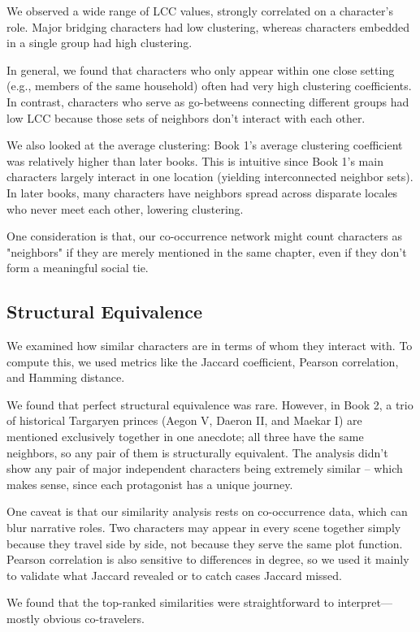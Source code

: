 \documentclass[12pt, a4paper]{article}
\begin{document}
	We observed a wide range of LCC values, strongly correlated on a character's role. Major bridging characters had low clustering, whereas characters embedded in a single group had high clustering. 
	
	In general, we found that characters who only appear within one close setting (e.g., members of the same household) often had very high clustering coefficients. In contrast, characters who serve as go-betweens connecting different groups had low LCC because those sets of neighbors don't interact with each other. 
	
	We also looked at the average clustering: Book 1's average clustering coefficient was relatively higher than later books. This is intuitive since Book 1's main characters largely interact in one location (yielding interconnected neighbor sets). In later books, many characters have neighbors spread across disparate locales who never meet each other, lowering clustering. 
	
	One  consideration is that, our co-occurrence network might count characters as "neighbors" if they are merely mentioned in the same chapter, even if they don't form a meaningful social tie.
	
	\subsection*{Structural Equivalence} 
	We examined how similar characters are in terms of whom they interact with. To compute this, we used metrics like the Jaccard coefficient, Pearson correlation, and Hamming distance. 
	
	We found that perfect structural equivalence was rare. However, in Book 2, a trio of historical Targaryen princes (Aegon V, Daeron II, and Maekar I) are mentioned exclusively together in one anecdote; all three have the same neighbors, so any pair of them is structurally equivalent. 
	The analysis didn't show any pair of major independent characters being extremely similar – which makes sense, since each protagonist has a unique journey. 
	
	One caveat is that our similarity analysis rests on co-occurrence data, which can blur narrative roles. Two characters may appear in every scene together simply because they travel side by side, not because they serve the same plot function. Pearson correlation is also sensitive to differences in degree, so we used it mainly to validate what Jaccard revealed or to catch cases Jaccard missed.
	
	We found that the top-ranked similarities were straightforward to interpret—mostly obvious co-travelers.
	
\end{document}
